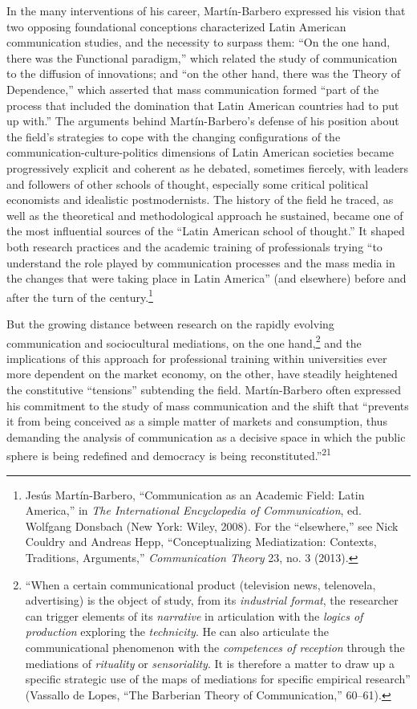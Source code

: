 \documentclass{tufte-handout}
\begin{document}
In the many interventions of his career, Martín-Barbero expressed his
vision that two opposing foundational conceptions characterized Latin
American communication studies, and the necessity to surpass them: ``On
the one hand, there was the Functional paradigm,'' which related the
study of communication to the diffusion of innovations; and ``on the
other hand, there was the Theory of Dependence,'' which asserted that
mass communication formed ``part of the process that included the
domination that Latin American countries had to put up with.'' The
arguments behind Martín-Barbero's defense of his position about the
field's strategies to cope with the changing configurations of the
communication-culture-politics dimensions of Latin American societies
became progressively explicit and coherent as he debated, sometimes
fiercely, with leaders and followers of other schools of thought,
especially some critical political economists and idealistic
postmodernists. The history of the field he traced, as well as the
theoretical and methodological approach he sustained, became one of the
most influential sources of the ``Latin American school of thought.'' It
shaped both research practices and the academic training of
professionals trying ``to understand the role played by communication
processes and the mass media in the changes that were taking place in
Latin America'' (and elsewhere) before and after the turn of the
century.\footnote{Jesús Martín-Barbero, ``Communication as an Academic Field: Latin
  America,'' in \emph{The International Encyclopedia of Communication},
  ed. Wolfgang Donsbach (New York: Wiley, 2008). For the ``elsewhere,''
  see Nick Couldry and Andreas Hepp, ``Conceptualizing Mediatization:
  Contexts, Traditions, Arguments,'' \emph{Communication Theory} 23, no.
  3 (2013).
}

But the growing distance between research on the rapidly evolving
communication and sociocultural mediations, on the one
hand,\footnote{``When a certain communicational product (television news, telenovela,
  advertising) is the object of study, from its \emph{industrial
  format}, the researcher can trigger elements of its \emph{narrative}
  in articulation with the \emph{logics of production} exploring the
  \emph{technicity}. He can also articulate the communicational
  phenomenon with the \emph{competences of reception} through the
  mediations of \emph{rituality} or \emph{sensoriality}. It is therefore
  a matter to draw up a specific strategic use of the maps of mediations
  for specific empirical research'' (Vassallo de Lopes, ``The Barberian
  Theory of Communication,'' 60--61).
} and the implications of
this approach for professional training within universities ever more
dependent on the market economy, on the other, have steadily heightened
the constitutive ``tensions'' subtending the field. Martín-Barbero often
expressed his commitment to the study of mass communication and the
shift that ``prevents it from being conceived as a simple matter of
markets and consumption, thus demanding the analysis of communication as
a decisive space in which the public sphere is being redefined and
democracy is being
reconstituted.''\textsuperscript{21}
\end{document}
